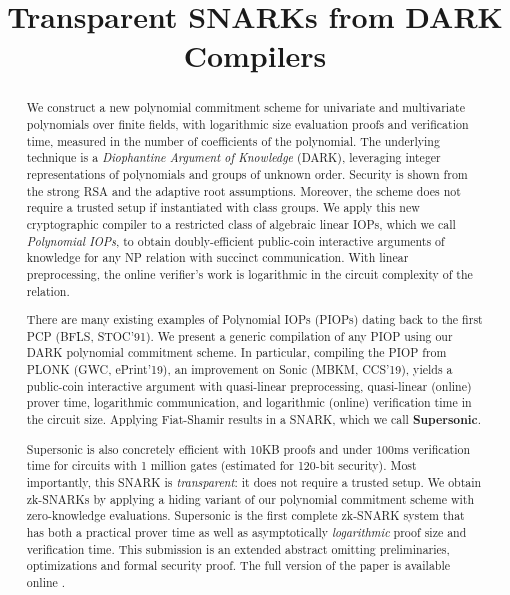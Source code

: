 \documentclass[12pt]{article}
\title{Transparent SNARKs from DARK Compilers}
\date{}
\theoremstyle{definition}
\begin{document}
\maketitle

\begin{abstract} 
We construct a new polynomial commitment scheme for univariate and multivariate polynomials over finite fields, with logarithmic size evaluation proofs and verification time, measured in the number of coefficients of the polynomial. The underlying technique is a \emph{Diophantine Argument of Knowledge} (DARK), leveraging integer representations of polynomials and groups of unknown order. Security is shown from the strong RSA and the adaptive root assumptions. Moreover, the scheme does not require a trusted setup if instantiated with class groups. We apply this new cryptographic compiler to a restricted class of algebraic linear IOPs, which we call \emph{Polynomial IOPs}, to obtain doubly-efficient public-coin interactive arguments of knowledge for any NP relation with succinct communication. With linear preprocessing, the online verifier's work is logarithmic in the circuit complexity of the relation.

There are many existing examples of Polynomial IOPs (PIOPs) dating back to the first PCP (BFLS, STOC'91). %
We present a generic compilation of any PIOP using our DARK polynomial commitment scheme. In particular, compiling the PIOP from \textsf{PLONK} (GWC, ePrint'19), an improvement on \textsf{Sonic} (MBKM, CCS'19), yields a public-coin interactive argument with quasi-linear preprocessing, quasi-linear (online) prover time, logarithmic communication, and logarithmic (online) verification time in the circuit size. Applying Fiat-Shamir results in a SNARK, which we call \textsf{\textbf{Supersonic}}. 

\textsf{Supersonic} is also concretely efficient with 10KB proofs and under $100$ms verification time for circuits with 1 million gates (estimated for 120-bit security). Most importantly, this SNARK is \emph{transparent}: it does not require a trusted setup. We obtain zk-SNARKs by applying a hiding variant of our polynomial commitment scheme with zero-knowledge evaluations. \textsf{Supersonic} is the first complete zk-SNARK system that has both a practical prover time as well as asymptotically \emph{logarithmic} proof size and verification time. This submission is an extended abstract omitting preliminaries, optimizations and formal security proof. The full version of the paper is available online \cite{fullversion}.


\end{abstract} 
\end{document}

